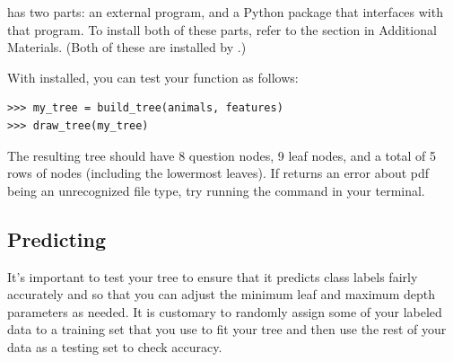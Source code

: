 \begin{problem}
 has two parts: an external program, and a Python package that interfaces with that program.
To install both of these parts, refer to the section in Additional Materials.
(Both of these are installed by .)

With  installed, you can test your  function as follows:
\begin{lstlisting}
>>> my_tree = build_tree(animals, features)
>>> draw_tree(my_tree)
\end{lstlisting}
The resulting tree should have 8 question nodes, 9 leaf nodes, and a total of 5 rows of nodes (including the lowermost leaves).
If  returns an error about pdf being an unrecognized file type, try running the command  in your terminal.
\end{problem}

\subsection*{Predicting}
It's important to test your tree to ensure that it predicts class labels fairly accurately and so that you can adjust the minimum leaf and maximum depth parameters as needed.
It is customary to randomly assign some of your labeled data to a training set that you use to fit your tree and then use the rest of your data as a testing set to check accuracy.

